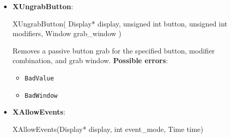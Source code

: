 \documentclass{report}
\begin{document}
\begin{itemize}
\begin{itemize}
                \item event\_mask Specifies which pointer events are reported to the client. The mask is the bitwise inclusive OR of the valid pointer event mask bits.
                \item pointer\_mode Specifies further processing of pointer events. You can pass GrabModeSync or GrabModeAsync.
                \item keyboard\_mode Specifies further processing of keyboard events. You can pass GrabModeSync or GrabModeAsync.
                \item confine\_to Specifies the window to confine the pointer in or None.
                \item cursor Specifies the cursor that is to be displayed or None.
            \end{itemize}
            \textbf{Possible errors}:
            \begin{itemize}
                \item \texttt{BadAccess}
                \item \texttt{BadCursor}
                \item \texttt{BadValue}
                \item \texttt{BadWindow}
            \end{itemize}
        \item \textbf{XUngrabButton}:
            \bigbreak \noindent 
            \begin{cppcode}
                XUngrabButton(
                    Display* display,
                    unsigned int button,
                    unsigned int modifiers,
                    Window grab_window
                )
            \end{cppcode}
            \bigbreak \noindent
            Removes a passive button grab for the specified button, modifier combination, and grab window.
            \textbf{Possible errors}:
            \begin{itemize}
                \item \texttt{BadValue}
                \item \texttt{BadWindow}
            \end{itemize}
        \item \textbf{XAllowEvents}:
            \bigbreak \noindent 
            \begin{cppcode}
            XAllowEvents(Display* display, int event_mode, Time time)
            \end{cppcode}

\end{itemize}
\end{document}
